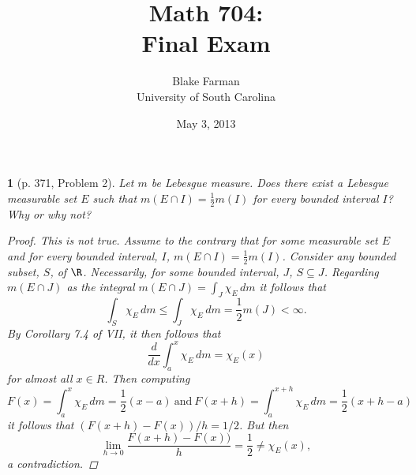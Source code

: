 \documentclass[12pt]{amsart}
\author{Blake Farman\\University of South Carolina}
\title{Math 704:\\Final Exam}
\date{May 3, 2013}
\begin{document}
\maketitle

\providecommand{\p}{\mathfrak{p}}
\providecommand{\m}{\mathfrak{m}}

\newtheorem{thm}{}
\newtheorem{lem}{Lemma}

\begin{thm}[p. 371, Problem 2]\label{ex1}
  Let $m$ be Lebesgue measure.  
  Does there exist a Lebesgue measurable set $E$ such that $m(E \cap I) = \frac{1}{2}m(I)$ for every bounded interval $I$?
  Why or why not?
  
  \begin{proof}
    This is not true.
    Assume  to the contrary that for some measurable set $E$ and for every bounded interval, $I$, $m(E \cap I) = \frac{1}{2}m(I)$.
    Consider any bounded subset, $S$, of $\R$.
    Necessarily, for some bounded interval, $J$, $S \subseteq J$.
    Regarding $m(E \cap J)$ as the integral $m(E \cap J) = \int_J \chi_E\, dm$
    it follows that
    $$\int_S \chi_E\, dm \leq \int_J \chi_E\, dm = \frac{1}{2}m(J) < \infty.$$
    By Corollary 7.4 of VII, it then follows that 
    $$\frac{d}{dx} \int_a^x \chi_E\, dm = \chi_E(x)$$
    for almost all $x \in R$.
    Then computing 
    $$F(x) = \int_a^x \chi_E\, dm = \frac{1}{2}(x - a)\ \text{and}\ F(x + h) = \int_a^{x + h} \chi_E\, dm = \frac{1}{2}(x + h - a)$$
    it follows that $(F(x + h) - F(x))/{h} = 1/2$.
    But then
    $$\lim_{h \rightarrow 0} \frac{F(x + h) - F(x))}{h} = \frac{1}{2} \neq \chi_E(x),$$
    a contradiction.
  \end{proof}
\end{thm}

\newpage
\end{document}
